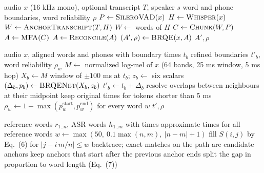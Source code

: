 
\begin{algorithm}[t]
\caption{Proposed alignment pipeline for one recording}
\label{alg:pipeline}
\begin{algorithmic}[1]
\Require audio $x$ (16 kHz mono), optional transcript $T$, speaker $s$
\Ensure word and phone boundaries, word reliability $\rho$
\State $P \gets \textsc{SileroVAD}(x)$ 
\State $H \gets \textsc{Whisper}(x)$ 
 
  \State $W \gets \textsc{AnchorTranscript}(T, H)$
\Else {}
  \State $W \gets$ words of $H$
\EndIf
\State $C \gets \textsc{Chunk}(W, P)$ 
\State $A \gets \textsc{MFA}(C)$ 
\State $A \gets \textsc{Reconcile}(A)$ 
\State $(A', \rho) \gets \textsc{BRQE}(x, A)$
\State \Return $A', \rho$
\end{algorithmic}
\end{algorithm}

\begin{algorithm}[t]
\caption{BRQE inference}
\label{alg:brqe}
\begin{algorithmic}[1]
\Require audio $x$, aligned words and phones with boundary times $t_b$
\Ensure refined boundaries $t'_b$, word reliability $\rho_w$
\State $M \gets$ normalized log-mel of $x$ (64 bands, 25 ms window, 5 ms hop)
  \State $X_b \gets M$ window of $\pm 100$ ms at $t_b$; $z_b \gets$ six scalars
  \State $(\Delta_b, p_b) \gets \textsc{BRQENet}(X_b, z_b)$ 
  \State $t'_b \gets t_b + \Delta_b$
\EndFor
\State resolve overlaps between neighbours at their midpoint
\State keep original times for tokens shorter than 5 ms
\State $\rho_w \gets 1 - \max(p^{\mathrm{start}}_w, p^{\mathrm{end}}_w)$ for every word $w$
\State \Return $t', \rho$
\end{algorithmic}
\end{algorithm}

\begin{algorithm}[t]
\caption{Transcript anchoring (scenario A)}
\label{alg:anchor}
\begin{algorithmic}[1]
\Require reference words $r_{1..n}$, ASR words $h_{1..m}$ with times
\Ensure approximate times for all reference words
\State $w \gets \max(50,\ 0.1\max(n,m),\ |n-m|+1)$
\State fill $S(i,j)$ by Eq.~(6) for $|j - i\,m/n| \le w$
\State backtrace; exact matches on the path are candidate anchors
\State keep anchors that start after the previous anchor ends
  \State split the gap in proportion to word length (Eq.~(7))
\EndFor
\end{algorithmic}
\end{algorithm}

